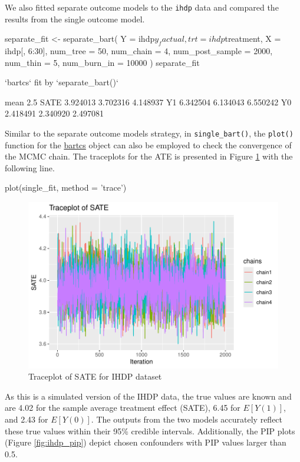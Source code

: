We also fitted separate outcome models to the \verb|ihdp| data and compared the results from the single outcome model.
\begin{example}
separate_fit <- separate_bart(
     Y               = ihdp$y_factual,
     trt             = ihdp$treatment,
     X               = ihdp[, 6:30],
     num_tree        = 50,
     num_chain       = 4,
     num_post_sample = 2000,
     num_thin        = 5,
     num_burn_in     = 10000
   )
separate_fit

`bartcs` fit by `separate_bart()`

         mean     2.5%
SATE 3.924013 3.702316 4.148937
Y1   6.342504 6.134043 6.550242
Y0   2.418491 2.340920 2.497081
\end{example}

Similar to the separate outcome models strategy, in \verb|single_bart()|, the \verb|plot()| function for the \href{https://CRAN.R-project.org/package=bartcs}{bartcs} object can also be employed to check the convergence of the MCMC chain. The traceplots for the ATE is presented in Figure \ref{fig:ihdp_trace} with the following line.

\begin{example}
plot(single_fit, method = 'trace')
\end{example}

\begin{figure}[htbp]
\centering
\includegraphics[width=0.6\linewidth]{fig/ihdp_trace_ATE.pdf}
\caption{Traceplot of SATE for IHDP dataset}\label{fig:ihdp_trace}
\end{figure}







As this is a simulated version of the IHDP data, the true values are known and are 4.02 for the sample average treatment effect (SATE), 6.45 for $E[Y(1)]$, and 2.43 for $E[Y(0)]$. The outputs from the two models accurately reflect these true values within their 95\% credible intervals. Additionally, the PIP plots (Figure \ref{fig:ihdp_pip}) depict chosen confounders with PIP values larger than 0.5.

